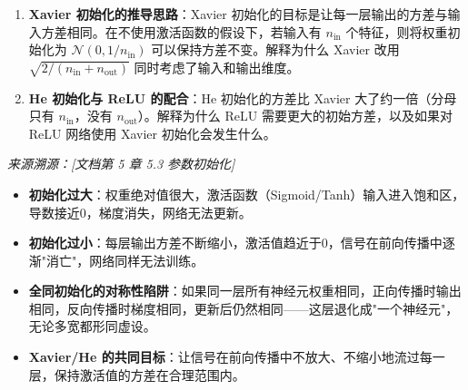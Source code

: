 \documentclass[a4paper,11pt]{ctexart}
\begin{document}
\begin{problembox}
\begin{enumerate}[(1)]
        \item \textbf{Xavier 初始化的推导思路}：Xavier 初始化的目标是让每一层输出的方差与输入方差相同。在不使用激活函数的假设下，若输入有 $n_{\text{in}}$ 个特征，则将权重初始化为 $\mathcal{N}(0, 1/n_{\text{in}})$ 可以保持方差不变。解释为什么 Xavier 改用 $\sqrt{2/(n_{\text{in}}+n_{\text{out}})}$ 同时考虑了输入和输出维度。

        \item \textbf{He 初始化与 ReLU 的配合}：He 初始化的方差比 Xavier 大了约一倍（分母只有 $n_{\text{in}}$，没有 $n_{\text{out}}$）。解释为什么 ReLU 需要更大的初始方差，以及如果对 ReLU 网络使用 Xavier 初始化会发生什么。
    \end{enumerate}

    \vspace{0.2cm}
    {\color{gray}\small\textit{来源溯源：[文档第 5 章 5.3 参数初始化]}}
\end{problembox}

\begin{beginnerbox}
    \begin{itemize}
        \item \textbf{初始化过大}：权重绝对值很大，激活函数（Sigmoid/Tanh）输入进入饱和区，导数接近0，梯度消失，网络无法更新。
        \item \textbf{初始化过小}：每层输出方差不断缩小，激活值趋近于0，信号在前向传播中逐渐"消亡"，网络同样无法训练。
        \item \textbf{全同初始化的对称性陷阱}：如果同一层所有神经元权重相同，正向传播时输出相同，反向传播时梯度相同，更新后仍然相同——这层退化成"一个神经元"，无论多宽都形同虚设。
        \item \textbf{Xavier/He 的共同目标}：让信号在前向传播中不放大、不缩小地流过每一层，保持激活值的方差在合理范围内。
    \end{itemize}
\end{beginnerbox}
\end{document}
